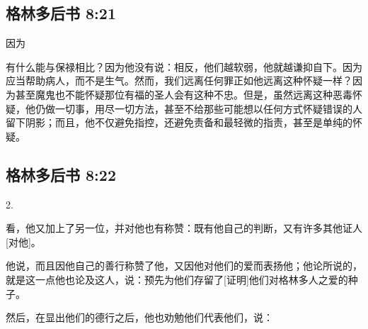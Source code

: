 \subsection{格林多后书 8:21}

因为\par

有什么能与保禄相比？因为他没有说：相反，他们越软弱，他就越谦抑自下。因为应当帮助病人，而不是生气。然而，我们远离任何罪正如他远离这种怀疑一样？因为甚至魔鬼也不能怀疑那位有福的圣人会有这种不忠。但是，虽然远离这种恶毒怀疑，他仍做一切事，用尽一切方法，甚至不给那些可能想以任何方式怀疑错误的人留下阴影；而且，他不仅避免指控，还避免责备和最轻微的指责，甚至是单纯的怀疑。\par


\subsection{格林多后书 8:22}

2. \par

看，他又加上了另一位，并对他也有称赞：既有他自己的判断，又有许多其他证人[对他]。\par

他说，而且因他自己的善行称赞了他，又因他对他们的爱而表扬他；他论所说的，就是这一点他也论及这人，说：预先为他们存留了[证明]他们对格林多人之爱的种子。\par

然后，在显出他们的德行之后，他也劝勉他们代表他们，说：\par


\subsection{}

\par

